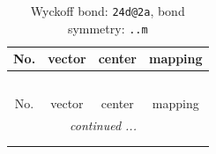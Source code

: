 \documentclass[fleqn,8pt]{jsarticle}
\begin{document}
\renewcommand{\arraystretch}{1.2}
\begin{longtable}{cccc}
\caption{Wyckoff bond: {\tt 24d@2a}, bond symmetry: {\tt ..m}}
 \\
 \hline \hline
No. & vector & center & mapping \\ \hline \endfirsthead

\multicolumn{3}{l}{\tablename\ \thetable{}} \\
 \hline \hline
No. & vector & center & mapping \\ \hline \endhead

 \hline \hline
\multicolumn{3}{r}{\footnotesize\it continued ...} \\ \endfoot

 \hline \hline
\multicolumn{3}{r}{} \\ \endlastfoot


\end{longtable}
\end{document}
